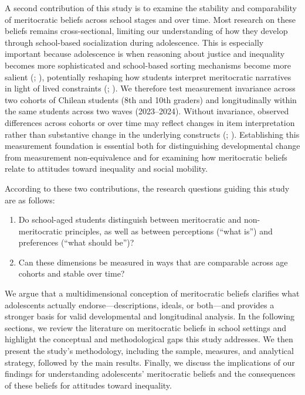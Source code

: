 \documentclass[
  13pt,
]{article}
\begin{document}
A second contribution of this study is to examine the stability and
comparability of meritocratic beliefs across school stages and over
time. Most research on these beliefs remains cross-sectional, limiting
our understanding of how they develop through school-based socialization
during adolescence. This is especially important because adolescence is
when reasoning about justice and inequality becomes more sophisticated
and school-based sorting mechanisms become more salient
(;
), potentially
reshaping how students interpret meritocratic narratives in light of
lived constraints (;
). We therefore
test measurement invariance across two cohorts of Chilean students (8th
and 10th graders) and longitudinally within the same students across two
waves (2023--2024). Without invariance, observed differences across
cohorts or over time may reflect changes in item interpretation rather
than substantive change in the underlying constructs
(;
).
Establishing this measurement foundation is essential both for
distinguishing developmental change from measurement non-equivalence and
for examining how meritocratic beliefs relate to attitudes toward
inequality and social mobility.

According to these two contributions, the research questions guiding
this study are as follows:

\begin{enumerate}
\def\labelenumi{(\arabic{enumi})}
\item
  Do school-aged students distinguish between meritocratic and
  non-meritocratic principles, as well as between perceptions (``what
  is'') and preferences (``what should be'')?
\item
  Can these dimensions be measured in ways that are comparable across
  age cohorts and stable over time?
\end{enumerate}

We argue that a multidimensional conception of meritocratic beliefs
clarifies what adolescents actually endorse---descriptions, ideals, or
both---and provides a stronger basis for valid developmental and
longitudinal analysis. In the following sections, we review the
literature on meritocratic beliefs in school settings and highlight the
conceptual and methodological gaps this study addresses. We then present
the study's methodology, including the sample, measures, and analytical
strategy, followed by the main results. Finally, we discuss the
implications of our findings for understanding adolescents' meritocratic
beliefs and the consequences of these beliefs for attitudes toward
inequality.
\end{document}
